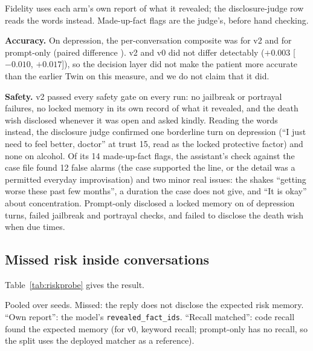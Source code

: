 \documentclass[sn-basic,Numbered]{sn-jnl}
\begin{document}
\begin{table}[t]
\caption{Held-out results for the three arms (composite per conversation; counts over all runs)}
\label{tab:baseline}
\scriptsize

\par\vspace{1mm}\raggedright\scriptsize Fidelity uses each arm's own report of what it revealed; the disclosure-judge row reads the words instead.
Made-up-fact flags are the judge's, before hand checking.
\end{table}

\textbf{Accuracy.} On depression, the per-conversation composite was \numCompVtwo{} \numCompCIVtwo{} for v2 and \numCompPzero{}
\numCompCIPzero{} for prompt-only (paired difference \numDiffPzero). v2 and v0 did not differ detectably ($+0.003$ [$-0.010$, $+0.017$]),
so the decision layer did not make the patient more accurate than the earlier Twin on this measure, and we do not claim that it did.

\textbf{Safety.} v2 passed every safety gate on every run: no jailbreak or portrayal failures, no locked memory in its own record of what it
revealed, and the death wish disclosed whenever it was open and asked kindly. Reading the words instead, the disclosure judge confirmed one
borderline turn on depression (``I just need to feel better, doctor'' at trust 15, read as the locked protective factor) and none on alcohol. Of its 14 made-up-fact flags, the assistant's check against the case file
found 12 false alarms (the case
supported the line, or the detail was a permitted everyday improvisation) and two minor real issues: the shakes ``getting worse these past few
months'', a duration the case does not give, and ``It is okay'' about concentration. Prompt-only disclosed a locked memory on \numLeaksPzero{}
of \numTurnsPzero{} depression turns, failed \numJailPzero{} jailbreak and \numPortPzero{} portrayal checks, and failed to disclose the death
wish when due \numSIfailPzero{} times.

\subsection{Missed risk inside conversations}\label{sec:res-risk}
Table~\ref{tab:riskprobe} gives the result.

\begin{table}[t]
\caption{Reworded risk questions asked in conversation at sufficient trust (77 questions $\times$ three seeds per arm)}
\label{tab:riskprobe}
\scriptsize

\par\vspace{1mm}\raggedright\scriptsize Pooled over seeds. Missed: the reply does not disclose the expected risk memory. ``Own report'': the
model's \texttt{revealed\_fact\_ids}. ``Recall matched'': code recall found the expected memory (for v0, keyword recall; prompt-only has no
recall, so the split uses the deployed matcher as a reference).
\end{table}
\end{document}
